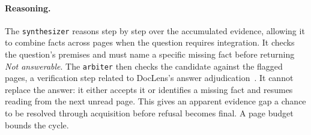 \documentclass[11pt]{article}
\begin{document}
\paragraph{Reasoning.}
The \texttt{synthesizer} reasons step by step over the accumulated evidence, allowing it to combine facts across pages when the question requires integration. It checks the question's premises and must name a specific missing fact before returning \emph{Not answerable}. The \texttt{arbiter} then checks the candidate against the flagged pages, a verification step related to DocLens's answer adjudication~\citep{zhu2026doclens}. It cannot replace the answer: it either accepts it or identifies a missing fact and resumes reading from the next unread page. This gives an apparent evidence gap a chance to be resolved through acquisition before refusal becomes final. A page budget bounds the cycle.



\end{document}
